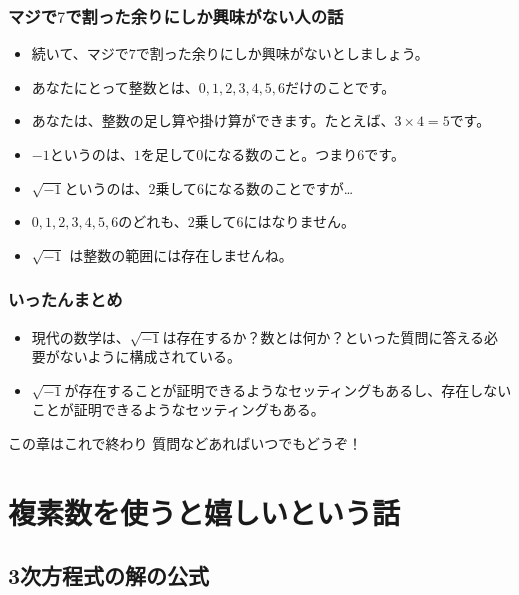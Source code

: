 \documentclass[dvipdfmx]{beamer}
\begin{document}
  \begin{frame}
    \frametitle{マジで$7$で割った余りにしか興味がない人の話}

    \begin{itemize}
      \item 続いて、\alert{マジで$7$で割った余りにしか興味がない}としましょう。
      \item あなたにとって\alert{整数とは、$0, 1, 2, 3, 4, 5, 6$だけ}のことです。
      \item あなたは、整数の足し算や掛け算ができます。たとえば、$3 \times 4 = 5$です。

      \pause

      \item $-1$というのは、$1$を足して$0$になる数のこと。つまり$6$です。
      \item $\sqrt{-1}$というのは、$2$乗して$6$になる数のことですが…
      \item $0, 1, 2, 3, 4, 5, 6$のどれも、$2$乗して$6$にはなりません。
      \item $\sqrt{-1}$ は整数の範囲には存在しませんね。
    \end{itemize}

  \end{frame}

  \begin{frame}
    \frametitle{いったんまとめ}

    \begin{itemize}
      \item 現代の数学は、$\sqrt{-1}$は存在するか？数とは何か？といった質問に答える必要がないように構成されている。
      \item $\sqrt{-1}$が存在することが証明できるようなセッティングもあるし、存在しないことが証明できるようなセッティングもある。
    \end{itemize}

    \begin{block}{この章はこれで終わり}
      質問などあればいつでもどうぞ！
    \end{block}

  \end{frame}

  \section{複素数を使うと嬉しいという話}

  \subsection{3次方程式の解の公式}
\end{document}
